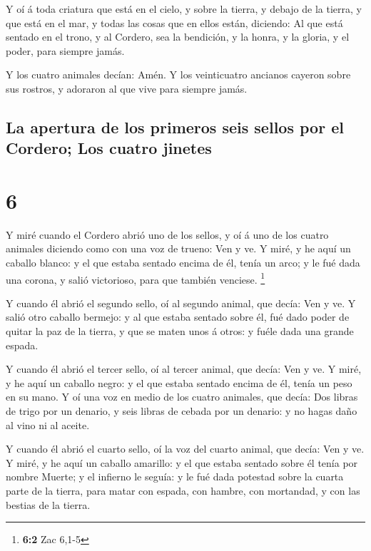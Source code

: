  Y oí á toda criatura que está en el cielo, y sobre la
tierra, y debajo de la tierra, y que está en el mar, y todas las cosas
que en ellos están, diciendo: Al que está sentado en el trono, y al
Cordero, sea la bendición, y la honra, y la gloria, y el poder, para
siempre jamás.

 Y los cuatro animales decían: Amén. Y los veinticuatro
ancianos cayeron sobre sus rostros, y adoraron al que vive para siempre
jamás.

\hypertarget{la-apertura-de-los-primeros-seis-sellos-por-el-cordero-los-cuatro-jinetes}{%
\subsection{La apertura de los primeros seis sellos por el Cordero; Los
cuatro
jinetes}\label{la-apertura-de-los-primeros-seis-sellos-por-el-cordero-los-cuatro-jinetes}}

\hypertarget{section-5}{%
\section{6}\label{section-5}}

 Y miré cuando el Cordero abrió uno de los sellos, y oí á
uno de los cuatro animales diciendo como con una voz de trueno: Ven y
ve.  Y miré, y he aquí un caballo blanco: y el que estaba
sentado encima de él, tenía un arco; y le fué dada una corona, y salió
victorioso, para que también venciese. \footnote{\textbf{6:2} Zac 6,1-5}

 Y cuando él abrió el segundo sello, oí al segundo animal,
que decía: Ven y ve.  Y salió otro caballo bermejo: y al que
estaba sentado sobre él, fué dado poder de quitar la paz de la tierra, y
que se maten unos á otros: y fuéle dada una grande espada.

 Y cuando él abrió el tercer sello, oí al tercer animal, que
decía: Ven y ve. Y miré, y he aquí un caballo negro: y el que estaba
sentado encima de él, tenía un peso en su mano.  Y oí una
voz en medio de los cuatro animales, que decía: Dos libras de trigo por
un denario, y seis libras de cebada por un denario: y no hagas daño al
vino ni al aceite.

 Y cuando él abrió el cuarto sello, oí la voz del cuarto
animal, que decía: Ven y ve.  Y miré, y he aquí un caballo
amarillo: y el que estaba sentado sobre él tenía por nombre Muerte; y el
infierno le seguía: y le fué dada potestad sobre la cuarta parte de la
tierra, para matar con espada, con hambre, con mortandad, y con las
bestias de la tierra.

